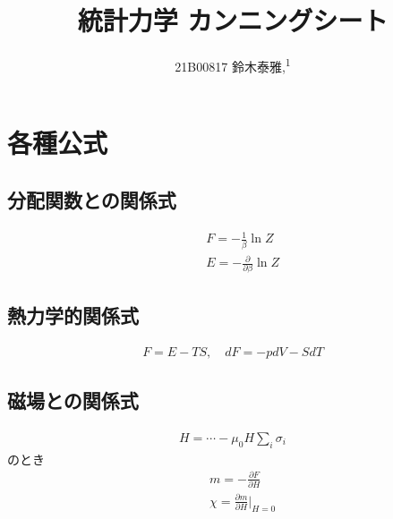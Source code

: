\documentclass[12pt,dvipdfmx]{jsarticle}
\newcommand\authormark[1]{\textsuperscript{#1}}
\begin{document}
\title{統計力学 カンニングシート}

\author{21B00817 鈴木泰雅,\authormark{1}}
\section*{\Large{各種公式}}
\subsection*{分配関数との関係式}
\begin{eqnarray}
  &&F = -\frac{1}{\beta}\ln Z\\
  &&E = -\frac{\partial}{\partial\beta}\ln Z
\end{eqnarray}
\subsection*{熱力学的関係式}
\begin{eqnarray}
  F = E-TS,\quad dF = -pdV -SdT 
\end{eqnarray}
\subsection*{磁場との関係式}
\begin{eqnarray}
  H = \cdots - \mu_0H\sum_i \sigma_i
\end{eqnarray}
のとき
\begin{eqnarray}
  &&m= -\frac{\partial F}{\partial H}\\
  &&\chi = \frac{\partial m}{\partial H}|_{H=0}
\end{eqnarray}
\end{document}
